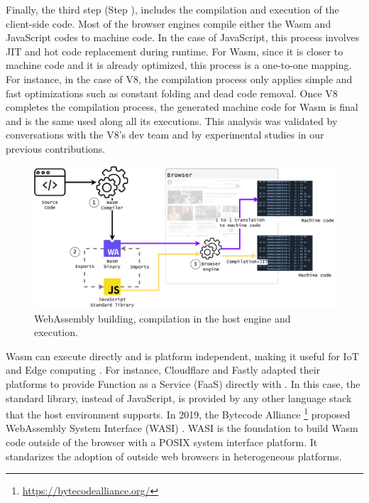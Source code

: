 Finally, the third step (Step ), includes the compilation and execution of the client-side code. Most of the browser engines compile either the Wasm and JavaScript codes to machine code. In the case of JavaScript, this process involves JIT and hot code replacement during runtime. For Wasm, since it is closer to machine code and it is already optimized, this process is a one-to-one mapping. For instance, in the case of V8, the compilation process only applies simple and fast optimizations such as constant folding and dead code removal. Once V8 completes the compilation process, the generated machine code for Wasm is final and is the same used along all its executions. This analysis was validated by conversations with the V8's dev team and by experimental studies in our previous contributions.  

\begin{figure}[h]
    \centering
    \includegraphics[width=\linewidth]{diagrams/wasm_workflow.pdf}
    \caption{WebAssembly building, compilation in the host engine and execution. }
    \label{diagrams:sota:wasm}
\end{figure}

Wasm can execute directly and is platform independent, making it useful for IoT and Edge computing \cite{Narayan2021Swivel,Sledge}. For instance, Cloudflare and Fastly adapted their platforms to provide Function as a Service (FaaS) directly with \wasm. In this case, the standard library, instead of JavaScript, is provided by any other language stack that the host environment supports.
In 2019, the Bytecode Alliance \footnote{\url{https://bytecodealliance.org/}} proposed WebAssembly System Interface (WASI) \cite{WASI}. WASI is the foundation to build Wasm code outside of the browser with a POSIX system interface platform. It standarizes the adoption of \wasm outside web browsers \cite{bryant2020webassembly} in heterogeneous platforms. 

